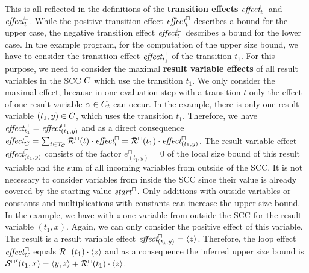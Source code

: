 \begin{example}
  This is all reflected in the definitions of the \textbf{transition effects} $\emph{effect}^\sqcap_t$ and $\emph{effect}^\sqcup_t$.
  While the positive transition effect $\emph{effect}^\sqcap_t$ describes a bound for the upper case, the negative transition effect $\emph{effect}^\sqcup_t$ describes a bound for the lower case.
  In the example program, for the computation of the upper size bound, we have to consider the transition effect $\emph{effect}^\sqcap_{t_1}$ of the transition $t_1$.
  For this purpose, we need to consider the maximal \textbf{result variable effects} of all result variables in the SCC $C$ which use the transition $t_1$.
  We only consider the maximal effect, because in one evaluation step with a transition $t$ only the effect of one result variable $\alpha \in C_t$ can occur.
  In the example, there is only one result variable $(t_1,y) \in C$, which uses the transition $t_1$.
  Therefore, we have $\emph{effect}^\sqcap_{t_1} = \emph{effect}^\sqcap_{(t_1,y)}$ and as a direct consequence $\emph{effect}^\sqcap_C = \sum_{t \in \mathcal{T}_C} {\mathcal{R}^\sqcap}(t) \cdot \emph{effect}^\sqcap_{t} = {\mathcal{R}^\sqcap}(t_1) \cdot \emph{effect}^\sqcap_{(t_1,y)}$.
  The result variable effect $\emph{effect}^\sqcap_{(t_1,y)}$ consists of the factor $e^\sqcap_{(t_1,y)} = 0$ of the local size bound of this result variable and the sum of all incoming variables from outside of the SCC.
  It is not necessary to consider variables from inside the SCC since their value is already covered by the starting value $\emph{start}^\sqcap$.
  Only additions with outside variables or constants and multiplications with constants can increase the upper size bound.
  In the example, we have with $z$ one variable from outside the SCC for the result variable $(t_1,x)$.
  Again, we can only consider the positive effect of this variable.
  The result is a result variable effect $\emph{effect}^\sqcap_{(t_1,y)} = \left\langle z \right\rangle$.
  Therefore, the loop effect $\emph{effect}^\sqcap_C$ equals ${\mathcal{R}^\sqcap}(t_1) \cdot \left\langle z \right\rangle$ and as a consequence the inferred upper size bound is ${\mathcal{S}^\sqcap}'(t_1,x) = \left\langle y,z \right\rangle + {\mathcal{R}^\sqcap}(t_1) \cdot \left\langle z \right\rangle$.
\end{example}
